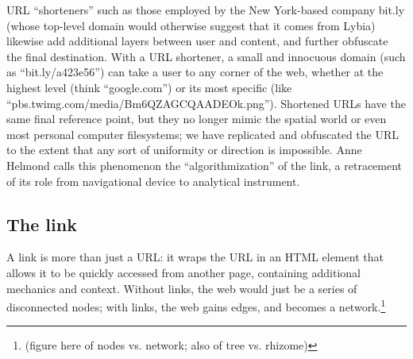 URL ``shorteners'' such as those employed by the New York-based company bit.ly (whose top-level domain would otherwise suggest that it comes from Lybia) likewise add additional layers between user and content, and further obfuscate the final destination. With a URL shortener, a small and innocuous domain (such as ``bit.ly/a423e56'') can take a user to any corner of the web, whether at the highest level (think ``google.com'') or its most specific (like ``pbs.twimg.com/media/Bm6QZAGCQAADEOk.png''). Shortened URLs have the same final reference point, but they no longer mimic the spatial world or even most personal computer filesystems; we have replicated and obfuscated the URL to the extent that any sort of uniformity or direction is impossible. Anne Helmond calls this phenomenon the ``algorithmization'' of the link, a retracement of its role from navigational device to analytical instrument.\autocite{helmond_algorithmization_2013}


\subsection{The link}

A link is more than just a URL: it wraps the URL in an HTML element that allows it to be quickly accessed from another page, containing additional mechanics and context. Without links, the web would just be a series of disconnected nodes; with links, the web gains edges, and becomes a network.\footnote{(figure here of nodes vs. network; also of tree vs. rhizome)} 


